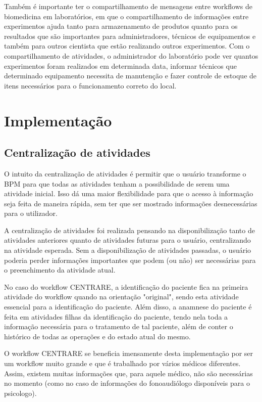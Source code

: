 Também é importante ter o compartilhamento de mensagens entre workflows de biomedicina em laboratórios, em que o compartilhamento de informações entre experimentos ajuda tanto para armazenamento de produtos quanto para os resultados que são importantes para administradores, técnicos de equipamentos e também para outros cientista que estão realizando outros experimentos. Com o compartilhamento de atividades, o administrador do laboratório pode ver quantos experimentos foram realizados em determinada data, informar técnicos que determinado equipamento necessita de manutenção e fazer controle de estoque de itens necessários para o funcionamento correto do local.

\section{Implementação}

\subsection{Centralização de atividades}

O intuito da centralização de atividades é permitir que o usuário transforme o BPM para que todas as atividades tenham a possibilidade de serem uma atividade inicial. Isso dá uma maior flexibilidade para que o acesso à informação seja feita de maneira rápida, sem ter que ser mostrado informações desnecessárias para o utilizador.

A centralização de atividades foi realizada pensando na disponibilização tanto de atividades anteriores quanto de atividades futuras para o usuário, centralizando na atividade esperada. Sem a disponibilização de atividades passadas, o usuário poderia perder informações importantes que podem (ou não) ser necessárias para o preenchimento da atividade atual.

No caso do workflow CENTRARE, a identificação do paciente fica na primeira atividade do workflow quando na orientação "original", sendo esta atividade essencial para a identificação do paciente. Além disso, a anamnese do paciente é feita em atividades filhas da identificação do paciente, tendo nela toda a informação necessária para o tratamento de tal paciente, além de conter o histórico de todas as operações e do estado atual do mesmo.

O workflow CENTRARE se beneficia imensamente desta implementação por ser um workflow muito grande e que é trabalhado por vários médicos diferentes. Assim, existem muitas informações que, para aquele médico, não são necessárias no momento (como no caso de informações do fonoaudiólogo disponíveis para o psicologo).

